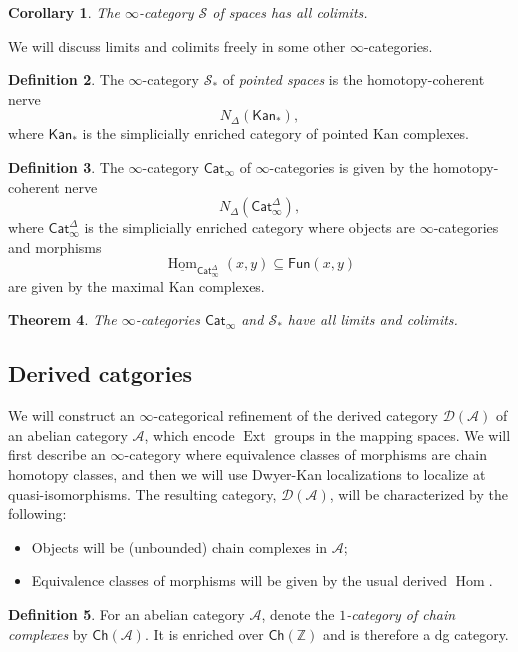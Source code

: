 \documentclass[10pt, oneside]{memoir}
\newtheorem{thm}{Theorem}[subsection]
\newtheorem{cor}[thm]{Corollary}
\theoremstyle{definition}
\newtheorem{defn}[thm]{Definition}
\theoremstyle{remark}
\theoremstyle{plain}
\theoremstyle{definition}
\theoremstyle{remark}
\newcommand{\Z}{\mathbb{Z}}
\newcommand{\mc}[1]{\mathcal{#1}}
\newcommand{\ms}[1]{\mathsf{#1}}
\newcommand{\ul}[1]{\underline{#1}}
\newcommand{\1}{\mathbf{1}}
\newcommand{\2}{\mathbf{2}}
\newcommand{\3}{\mathbf{3}}
\DeclareMathOperator{\Hom}{Hom}
\DeclareMathOperator{\Ext}{Ext}
\begin{document}
\begin{cor}
    The $\infty$-category $\mc{S}$ of spaces has all colimits.
\end{cor}

We will discuss limits and colimits freely in some other $\infty$-categories.
\begin{defn}
    The $\infty$-category $\mc{S}_*$ of \textit{pointed spaces} is the homotopy-coherent nerve
    \[ N_{\Delta}(\ms{Kan}_*), \]
    where $\ms{Kan}_*$ is the simplicially enriched category of pointed Kan complexes.
\end{defn}

\begin{defn}
    The $\infty$-category $\ms{Cat}_{\infty}$ of $\infty$-categories is given by the homotopy-coherent nerve
    \[ N_{\Delta}(\ms{Cat}_{\infty}^{\Delta}), \]
    where $\ms{Cat}_{\infty}^{\Delta}$ is the simplicially enriched category where objects are $\infty$-categories and morphisms
    \[ \ul{\Hom}_{\ms{Cat}_{\infty}^{\Delta}}(x,y) \subseteq \ms{Fun}(x,y) \]
    are given by the maximal Kan complexes.
\end{defn}

\begin{thm}
    The $\infty$-categories $\ms{Cat}_{\infty}$ and $\mc{S}_*$ have all limits and colimits.
\end{thm}


\subsection{Derived catgories}%
\label{sub:Derived catgories}

We will construct an $\infty$-categorical refinement of the derived category $\mc{D}(\mc{A})$ of an abelian category $\mc{A}$, which encode $\Ext$ groups in the mapping spaces. We will first describe an $\infty$-category where equivalence classes of morphisms are chain homotopy classes, and then we will use Dwyer-Kan localizations to localize at quasi-isomorphisms. The resulting category, $\mc{D}(\mc{A})$, will be characterized by the following:
\begin{itemize}
    \item Objects will be (unbounded) chain complexes in $\mc{A}$;
    \item Equivalence classes of morphisms will be given by the usual derived $\Hom$.
\end{itemize}

\begin{defn}
    For an abelian category $\mc{A}$, denote the \textit{$1$-category of chain complexes} by $\ms{Ch}(\mc{A})$. It is enriched over $\ms{Ch}(\Z)$ and is therefore a dg category.
\end{defn}
\end{document}
